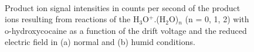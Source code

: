 \begin{figure}[htbp]
\centering
{}\\
\caption{Product ion signal intensities in counts per second of the product ions resulting from reactions of the H$_3$O$^+$.(H$_2$O)$_n$ (n = 0, 1, 2) with o-hydroxycocaine as a function of the drift voltage and the reduced electric field in (a) normal and (b) humid conditions.} 
\label{fig:ococaEN}
\end{figure}






































